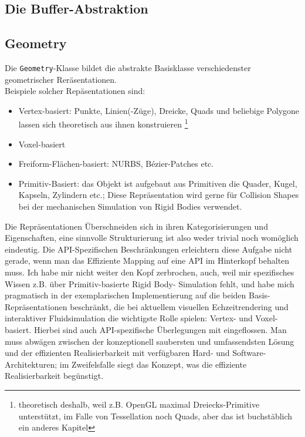 	

    	
\subsection{Die Buffer-Abstraktion}  
	
		



\subsection{Geometry}
	\label{sec:geometry}
	Die \lstinline|Geometry|-Klasse bildet die abstrakte Basisklasse verschiedenster geometrischer Reräsentationen.\\
	Beispiele solcher Repäsentationen sind:
	\begin{itemize}
		\item Vertex-basiert:  Punkte, Linien(-Züge), Dreicke, Quads und beliebige Polygone lassen sich theoretisch
		aus ihnen konstruieren \footnote{theoretisch deshalb, weil z.B. OpenGL maximal Dreiecks-Primitive unterstützt, im 
		Falle von Tessellation noch Quads, aber das ist buchstäblich ein anderes Kapitel}
		\item Voxel-basiert
		\item Freiform-Flächen-basiert: NURBS, Bézier-Patches etc.
		\item Primitiv-Basiert: das Objekt ist aufgebaut aus Primitiven die Quader, Kugel, Kapseln, Zylindern etc.;
			Diese Repräsentation wird gerne für Collision Shapes bei der mechanischen Simulation von Rigid Bodies verwendet.
	\end{itemize}
	Die Repräsentationen Überschneiden sich in ihren Kategorisierungen und Eigenschaften, eine sinnvolle Strukturierung ist 
	also weder trivial noch womöglich eindeutig. Die API-Spezifischen Beschränkungen erleichtern diese Aufgabe nicht 
	gerade, wenn man das Effiziente Mapping auf eine API im Hinterkopf behalten muss.
	Ich habe mir nicht weiter den Kopf zerbrochen, auch, weil mir spezifisches Wissen z.B. über Primitiv-basierte
	Rigid Body- Simulation fehlt, und habe mich pragmatisch in der exemplarischen Implementierung auf die
	beiden Basis-Repräsentationen beschränkt, die bei aktuellem visuellen Echzeitrendering und interaktiver
	Fluidsimulation die wichtigste Rolle spielen: Vertex- und Voxel-basiert. Hierbei sind auch API-spezifische Überlegungen
	mit eingeflossen. Man muss abwägen zwischen der konzeptionell saubersten und umfassendsten Lösung
	und der effizienten Realisierbarkeit mit verfügbaren Hard- und Software-Architekturen;
	im Zweifelsfalle siegt das Konzept, was die effiziente Realisierbarkeit begünstigt.\\
	
